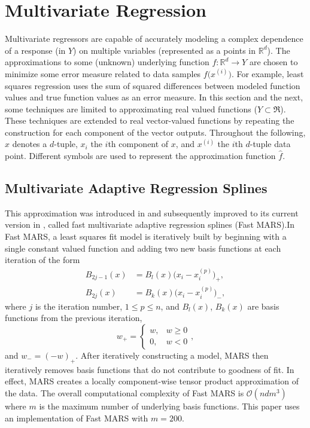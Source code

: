 \documentclass[sigconf]{acmart}
\begin{document}

\section{Multivariate Regression}
Multivariate regressors are capable of accurately modeling a complex dependence of a response (in $Y$) on multiple variables (represented as a points in $\mathbb{R}^{d}$). The approximations to some (unknown) underlying function $f: \mathbb{R}^d \rightarrow Y$ are chosen to minimize some error measure related to data samples $f\bigl(x^{(i)}\bigr)$. For example, least squares regression uses the sum of squared differences between modeled function values and true function values as an error measure. In this section and the next, some techniques are limited to approximating real valued functions ($Y \subset \Re$). These techniques are extended to real vector-valued functions by repeating the construction for each component of the vector outputs. Throughout the following, $x$ denotes a $d$-tuple, $x_i$ the $i$th component of $x$, and $x^{(i)}$ the $i$th $d$-tuple data point. Different symbols are used to represent the approximation function $\hat f$.

\subsection{Multivariate Adaptive Regression Splines}
This approximation was introduced in \cite{friedman1991multivariate} and subsequently improved to its current version in \cite{stanford1993fast}, called fast multivariate adaptive regression splines (Fast MARS).In Fast MARS, a least squares fit model is iteratively built by beginning with a single constant valued function and adding two new basis functions at each iteration of the form
\begin{align*}
  B_{2j-1}(x) &= B_l(x) \bigl(x_i-x^{(p)}_i\bigr)_+, \\
  B_{2j}(x) &= B_k(x) \bigl(x_i-x^{(p)}_i\bigr)_- ,
\end{align*}
where $j$ is the iteration number, $1 \le p \le n$, and $B_l(x)$, $B_k(x)$ are basis functions from the previous iteration,
$$w_+ = \begin{cases} w, & w \geq 0 \\ 0, & w < 0 \end{cases},$$
and $w_- = (-w)_+$. After iteratively constructing a model, MARS then iteratively removes basis functions that do not contribute to goodness of fit. In effect, MARS creates a locally component-wise tensor product approximation of the data. The overall computational complexity of Fast MARS is $\mathcal{O}(n d m^3)$ where $m$ is the maximum number of underlying basis functions. This paper uses an implementation of Fast MARS \cite{rudy2017pyearth} with $m = 200$.
\end{document}
